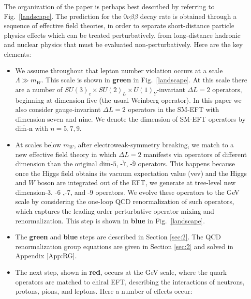 \documentclass[letterpaper,11pt]{article}
\newcommand{\textoverline}[1]{$\overline{\mbox{#1}}$}
\begin{document}
The organization of the paper is perhaps best described by referring to Fig.~\ref{landscape}. 
The prediction for the $0 \nu \beta \beta$ decay rate is  
obtained through  a sequence of effective field theories, in order to separate short-distance 
particle physics effects which can be treated perturbatively, from long-distance hadronic and nuclear physics that must be evaluated non-perturbatively. 
Here are the key elements:
\begin{itemize} 

\item   We assume  throughout that lepton number violation occurs at a scale $\Lambda \gg m_W$. This scale is shown in \textcolor{forestgreen(web)}{\textbf{green}} in Fig.~\ref{landscape}. At this scale there are a number of    $SU(3)_c\times  SU(2)_{L} \times U(1)_{Y}$-invariant   $\Delta L=2$  operators, beginning at dimension five (the usual Weinberg operator). In this paper we also consider  gauge-invariant  $\Delta L=2$ operators  in the SM-EFT with dimension seven and nine. 
We denote the  dimension of  SM-EFT operators  by \textoverline{dim-n}  with $n=5,7,9$.

\item At scales below $m_W$, after electroweak-symmetry breaking, we match to a new effective field theory in which $\Delta L=2$ manifests via operators of different dimension than the original \textoverline{dim-5}, \textoverline{-7}, \textoverline{-9} operators. This happens because once the Higgs field obtains its vacuum expectation value (vev) and the Higgs and $W$ boson are integrated out of the EFT, we generate at tree-level new dimension-3, -6 ,-7, and -9 operators. We evolve these operators to the GeV scale by considering the one-loop QCD renormalization of such operators, which captures the leading-order perturbative operator mixing and renormalization. This step is shown in {\color{darkblue} \textbf{blue}} in  Fig.~\ref{landscape}. 

\item The {\color{forestgreen(web)} \textbf{green}} and {\color{darkblue} \textbf{blue}} steps are described in Section \ref{sec:2}. The QCD renormalization group equations are given in Section \ref{sec:2} and solved in Appendix \ref{App:RG}.

\item The next step, shown in {\color{darkred} \textbf{red}}, occurs at the GeV scale, where the quark operators are matched to chiral EFT, describing the interactions of neutrons, protons, pions, and leptons. Here a number of effects occur: 


\end{itemize}
\end{document}
